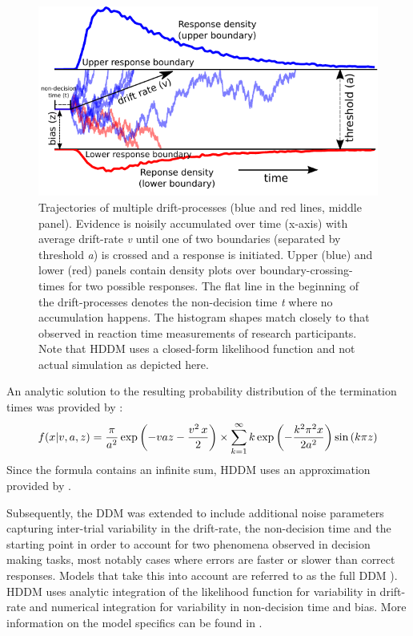 \documentclass[letterpaper,10pt,english]{article}
\begin{document}
\begin{figure}
\centering
\capstart

\includegraphics{DDM.pdf}
\caption{Trajectories of multiple drift-processes (blue and red lines, middle panel). Evidence is noisily accumulated over time (x-axis) with average drift-rate \textit{v} until one of two boundaries (separated by threshold \textit{a}) is crossed and a response is initiated. Upper (blue) and lower (red) panels contain density plots over boundary-crossing-times for two possible responses. The flat line in the beginning of the drift-processes denotes the non-decision time \textit{t} where no accumulation happens. The histogram shapes match closely to that observed in reaction time measurements of research participants. Note that HDDM uses a closed-form likelihood function and not actual simulation as depicted here.}\end{figure}

An analytic solution to the resulting probability distribution of
the termination times was provided by \citep{Feller68}:
\begin{gather}
\begin{split}f(x|v, a, z) = \frac{\pi}{a^2} \, \text{exp} \left( -vaz-\frac{v^2\,x}{2} \right) \times \sum_{k=1}^{\infty} k\, \text{exp} \left( -\frac{k^2\pi^2 x}{2a^2} \right) \text{sin}\left(k\pi z\right)\end{split}\notag
\end{gather}
Since the formula contains an infinite sum, HDDM uses an approximation
provided by \citep{NavarroFuss09}.

Subsequently, the DDM was extended to include additional noise parameters capturing inter-trial variability in the drift-rate, the non-decision time and the starting point in order to account for two phenomena observed in decision making tasks, most notably cases where errors are faster or slower than correct responses. Models that take this into account are referred to as the full DDM \citep{RatcliffRouder98}). HDDM uses analytic integration of the likelihood function for variability in drift-rate and numerical integration for variability in non-decision time and bias. More information on the model specifics can be found in \citep{SoferWieckiFrank}.
\end{document}
